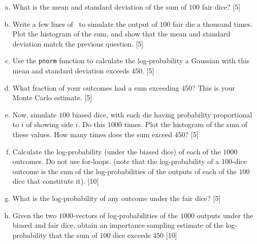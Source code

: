 \documentclass[10pt]{article}
\begin{document}
\begin{enumerate}[(a)]
  \item What is the mean and standard deviation of the sum of $100$ fair
    dice? \hfill[5]
  \item Write a few lines of \R\ to simulate the output of $100$ fair die
    a thousand times.  Plot the histogram of the sum, and show that the
    mean and standard deviation match the previous question. \hfill[5]
  \item Use the {\tt pnorm} function to calculate the log-probability a
    Gaussian with this mean and standard deviation exceeds $450$. \hfill[5]
  \item
    What fraction of your outcomes had a sum exceeding $450$? This is your Monte Carlo estimate.
     \hfill[5]
  \item Now, simulate $100$ biased dice, with each die having probability
    proportional to $i$ of showing side $i$. Do this $1000$ times.
    Plot the histogram of the sum of these values. How many times does
    the sum exceed $450$? \hfill[5]
  \item Calculate the log-probability (under the biased dice) of each of 
    the $1000$ outcomes.
    Do not use for-loops.  
    (note that the log-probability of a 100-dice outcome is the 
    sum of the log-probabilities of the outputs of each of the $100$ dice
    that constitute it).
    \hfill[10]
  \item What is the log-probability of any outcome under the fair dice? \hfill[5]
  \item Given the two $1000$-vectors of log-probabilities of the $1000$ outputs
    under the biased and fair dice, obtain an importance sampling
    estimate of the log-probability that the sum of $100$ dice exceeds
    $450$ \hfill[10]
\end{enumerate}
\end{document}
